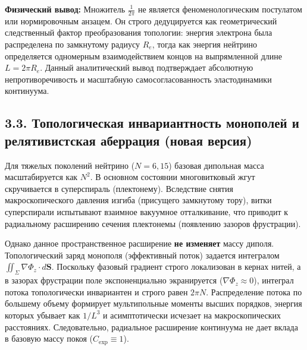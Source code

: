 \documentclass[11pt,a4paper]{article}
\begin{document}
	\textbf{Физический вывод:} Множитель $\frac{1}{2\pi}$ не является феноменологическим постулатом или нормировочным анзацем. Он строго дедуцируется как геометрический следственный фактор преобразования топологии: энергия электрона была распределена по замкнутому радиусу $R_e$, тогда как энергия нейтрино определяется одномерным взаимодействием концов на выпрямленной длине $L = 2\pi R_e$. Данный аналитический вывод подтверждает абсолютную непротиворечивость и масштабную самосогласованность эластодинамики континуума.
	
	\subsection{3.3. Топологическая инвариантность монополей и релятивистская аберрация (новая версия)}
	Для тяжелых поколений нейтрино ($N=6, 15$) базовая дипольная масса масштабируется как $N^2$. В основном состоянии многовитковый жгут скручивается в суперспираль (плектонему). Вследствие снятия макроскопического давления изгиба (присущего замкнутому тору), витки суперспирали испытывают взаимное вакуумное отталкивание, что приводит к радиальному расширению сечения плектонемы (появлению зазоров фрустрации).
	
	Однако данное пространственное расширение \textbf{не изменяет} массу диполя. Топологический заряд монополя (эффективный поток) задается интегралом $\iint_\Sigma \nabla \Phi_z \cdot d\mathbf{S}$. Поскольку фазовый градиент строго локализован в кернах нитей, а в зазорах фрустрации поле экспоненциально экранируется ($\nabla \Phi_z \approx 0$), интеграл потока топологически инвариантен и строго равен $2\pi N$. Распределение потока по большему объему формирует мультипольные моменты высших порядков, энергия которых убывает как $1/L^3$ и асимптотически исчезает на макроскопических расстояниях. Следовательно, радиальное расширение континуума не дает вклада в базовую массу покоя ($C_{\text{exp}} \equiv 1$).
	
\end{document}
